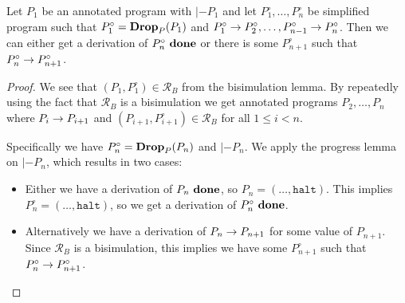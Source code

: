 \begin{theorem}
  \label{thm:soundness-simple}
  Let $P_1$ be an annotated program with $|- P_1$ and let
  $P^\circ_1, \dots, P^\circ_n$ be simplified program such that
  $P^\circ_1 = \mathbf{Drop}_{{P}}({P_1})$ and
  ${P^\circ_1} -> {P^\circ_2}, \dots, {P^\circ_{n-1}} -> {P^\circ_n}$.
  Then we can either get a derivation of ${P^\circ_n}\ \mathbf{done}$ or there is some
  $P^\circ_{n+1}$ such that ${P^\circ_n} -> {P^\circ_{n+1}}$.
\end{theorem}
\begin{proof}
  We see that $(P_1, P^\circ_1) \in \mathcal{R}_B$ from the bisimulation
  lemma. By repeatedly using the fact that $\mathcal{R}_B$ is a bisimulation we
  get annotated programs $P_2, \dots, P_n$ where ${P_i} -> {P_{i+1}}$ and
  $(P_{i+1}, P^\circ_{i+1}) \in \mathcal{R}_B$ for all $1 \le i < n$.

  Specifically we have $P^\circ_n = \mathbf{Drop}_{{P}}({P_n})$ and $|- P_n$. We apply the
  progress lemma on $|- P_n$, which results in two cases:

  \begin{itemize}
  \item Either we have a derivation of ${P_n}\ \mathbf{done}$, so
    $P_n = (\dots, \mathtt{halt})$. This implies
    $P^\circ_n = (\dots, \mathtt{halt})$, so we
    get a derivation of ${P^\circ_n}\ \mathbf{done}$.
  \item Alternatively we have a derivation of ${P_n} -> {P_{n+1}}$ for some
    value of $P_{n+1}$. Since $\mathcal{R}_B$ is a bisimulation, this implies we
    have some $P^\circ_{n+1}$ such that ${P^\circ_n} -> {P^\circ_{n+1}}$.
  \end{itemize}
\end{proof}

